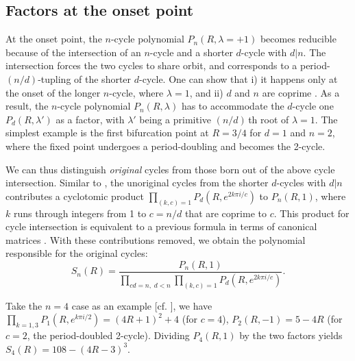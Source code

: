 \documentclass{ws-ijbc}
\begin{document}
\subsection{\label{sec:origfac}%
  Factors at the onset point}


At the onset point,
  the $n$-cycle polynomial
  $P_n(R, \lambda = +1)$
  becomes reducible
%
  because of the intersection of an $n$-cycle
  and a shorter $d$-cycle with $d|n$.
%
The intersection forces the two cycles to share orbit,
 and corresponds to
  a period-$(n/d)$-tupling \cite{hao}
  of the shorter $d$-cycle.
%
One can show that i) it happens only
  at the onset of the longer $n$-cycle, where $\lambda = 1$,
%
  and ii) $d$ and $n$ are coprime \cite{blackhurst}.
%
As a result, the $n$-cycle polynomial $P_n(R, \lambda)$
  has to accommodate the $d$-cycle one $P_d(R, \lambda')$ as a factor,
  with $\lambda'$ being a primitive $(n/d)\,$th root of $\lambda = 1$.
%
The simplest example is the first bifurcation point
  at $R = 3/4$ for $d = 1$ and $n = 2$,
  where the fixed point %
  undergoes a period-doubling and becomes the 2-cycle. %


We can thus distinguish \emph{original} cycles
  from those born out of the above cycle intersection. %
%
Similar to ,
  the unoriginal cycles
  from the shorter $d$-cycles with $d|n$
  contributes a cyclotomic product
  $\prod_{(k, c) = 1}
      P_{d}
        \left(
          R, e^{2k\pi i/c}
        \right)$ to $P_n(R, 1)$,
where $k$ runs through integers from 1 to $c=n/d$
  that are coprime to $c$.
%
This product for cycle intersection is equivalent to a previous
  formula in terms of canonical matrices \cite{blackhurst}.
%
With these contributions removed,
  we obtain the polynomial responsible for the original cycles:
  \begin{equation}
    S_n(R)
    = \frac
    {
      P_n(R, 1)
    }
    {
      \prod_{c d =  n, \; d < n}
        \prod_{(k, c) = 1}
      P_{d}
        \left(
          R, e^{2k\pi i/c}
        \right)
    }.
  \label{eq:origfac}
  \end{equation}


%
%
%
Take the $n = 4$ case as an example
[cf. ],
we have
$\prod_{k=1,3} P_1(R, e^{k\pi i/2})
=(4R+1)^2+4$
(for $c = 4$),
$P_2(R, -1) = 5 - 4R$
(for $c = 2$, the period-doubled 2-cycle).
%
Dividing $P_4(R, 1)$
by the two factors yields
$S_4(R) = 108-(4R-3)^3$.
\end{document}
